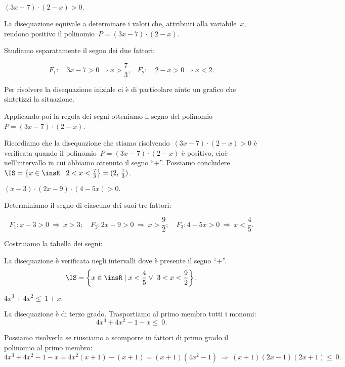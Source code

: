 \begin{exrig}
 \begin{esempio}
 $(3x-7)\cdot (2-x)>0.$

 La disequazione equivale a determinare i valori che, attribuiti alla
variabile~$x$, rendono positivo il polinomio~$P=(3x-7)\cdot (2-x)$.

Studiamo separatamente il segno dei due fattori:

\[F_{1}:\quad 3x-7>0\Rightarrow x>\frac{7}{3}\text{,}\quad
F_{2}:\quad 2-x>0\Rightarrow x<2.\]

Per risolvere la disequazione iniziale ci è di particolare aiuto un
grafico che sintetizzi la situazione.
\begin{center}
 
\end{center}

Applicando poi la regola dei
segni otteniamo il segno del polinomio~$P=(3x-7)\cdot (2-x)$.

Ricordiamo che la disequazione che stiamo risolvendo~$(3x-7)\cdot(2-x)>0$
è verificata quando il polinomio~$P=(3x-7)\cdot (2-x)$ è
positivo, cioè nell'intervallo in cui abbiamo
ottenuto il segno ``$+$''. Possiamo
concludere~$\IS=\left\{x\in\insR\mid 2<x<\frac{7}{3}\right\}=(2\text{,~}\frac{7}{3})$.
 \end{esempio}

 \begin{esempio}
$(x-3)\cdot (2x-9)\cdot (4-5x)>0.$

Determiniamo il segno di ciascuno dei suoi tre fattori:

\[
F_{1}: x-3>0\:\Rightarrow\: x>3;\quad
F_{2}: 2x-9>0\:\Rightarrow\: x>\frac{9}{2};\quad
F_{3}: 4-5x>0\:\Rightarrow\: x<\frac{4}{5}.
\]

Costruiamo la tabella dei segni:
\begin{center}
 
\end{center}

La disequazione è verificata negli intervalli dove è presente il
segno ``$+$''.
\[\IS=\left\{x\in\insR\mid x<\frac{4}{5}\vee~3<x<\frac{9}{2}\right\}.\]
\end{esempio}

\begin{esempio}
 $4x^{3}+4x^{2}\le~1+x.$

La disequazione è di terzo grado. Trasportiamo al primo membro tutti i
monomi:
\[4x^{3}+4x^{2}-1-x\le~0.\]

Possiamo risolverla se riusciamo a scomporre in fattori di primo grado
il polinomio al primo membro:
\[4x^{3}+4x^{2}-1-x=4x^{2}(x+1)-(x+1)=(x+1)(4x^2-1)\:\Rightarrow\: (x+1)(2x-1)(2x+1)\le~0.\]


\end{esempio}
\end{exrig}
